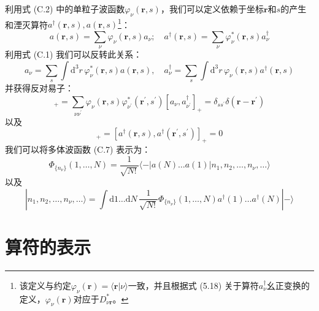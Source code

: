 利用式 (C.2) 中的单粒子波函数$\varphi_{\nu}(\boldsymbol{r},s)$，我们可以定义依赖于坐标$\boldsymbol{r}$和$s$的产生和湮灭算符$a^{\dagger}(\boldsymbol{r},s),a(\boldsymbol{r},s)$\footnote{该定义与约定$\varphi_{\nu}(\boldsymbol{r})=\langle\boldsymbol{r}|\nu\rangle$一致，并且根据式
(5.18) 关于算符$a^{\dagger}_{\nu}$幺正变换的定义，$\varphi_{\nu}(\boldsymbol{r})$对应于$D^{*}_{\nu\boldsymbol{r}}$。}：
\begin{equation}
a(\boldsymbol{r},s)=\sum_{\nu}\varphi_{\nu}(\boldsymbol{r},s)a_{\nu};\quad a^{\dagger}(\boldsymbol{r},s)=\sum_{\nu}\varphi^{*}_{\nu}(\boldsymbol{r},s)a^{\dagger}_{\nu}\label{eq:creation and annihilation at coordinates representation}
\end{equation}
利用式 (C.1) 我们可以反转此关系：
\begin{equation}
a_{\nu}=\sum_{s}\int\mathrm{d}^{3}r\,\varphi^{*}_{\nu}(\boldsymbol{r},s)a(\boldsymbol{r},s),\quad a^{\dagger}_{\nu}=\sum_{s}\int\mathrm{d}^{3}r\,\varphi_{\nu}(\boldsymbol{r},s)a^{\dagger}(\boldsymbol{r},s)\label{eq:appendix_c_invert_field_op}
\end{equation}
并获得反对易子：
\begin{equation}
[a(\boldsymbol{r},s),a^{\dagger}(\boldsymbol{r}^{\prime},s^{\prime})]_{+}=\sum_{\nu\nu^{\prime}}\varphi_{\nu}(\boldsymbol{r},s)\varphi^{*}_{\nu^{\prime}}(\boldsymbol{r}^{\prime},s^{\prime})[a_{\nu},a^{\dagger}_{\nu^{\prime}}]_{+}=\delta_{ss^{\prime}}\delta(\boldsymbol{r}-\boldsymbol{r}^{\prime})\label{eq:appendix_c_field_anticomm_1}
\end{equation}
以及
\begin{equation}
[a(\boldsymbol{r},s),a(\boldsymbol{r}^{\prime},s^{\prime})]_{+}=[a^{\dagger}(\boldsymbol{r},s),a^{\dagger}(\boldsymbol{r}^{\prime},s^{\prime})]_{+}=0\label{eq:appendix_c_field_anticomm_2}
\end{equation}
我们可以将多体波函数 (C.7) 表示为：
\begin{equation}
\Phi_{\{n_{\nu}\}}(1,\dots,N)=\frac{1}{\sqrt{N!}}\langle-|a(N)\dots a(1)|n_{1},n_{2},\dots,n_{\nu},\dots\rangle\label{eq:appendix_c_many_body_field_overlap}
\end{equation}
以及
\begin{equation}
|n_{1},n_{2},\dots,n_{\nu},\dots\rangle=\int\mathrm{d}1\dots\mathrm{d}N\,\frac{1}{\sqrt{N!}}\Phi_{\{n_{\nu}\}}(1,\dots,N)a^{\dagger}(1)\dots a^{\dagger}(N)|-\rangle\label{eq:appendix_c_many_body_state_from_field}
\end{equation}


\section{算符的表示}

